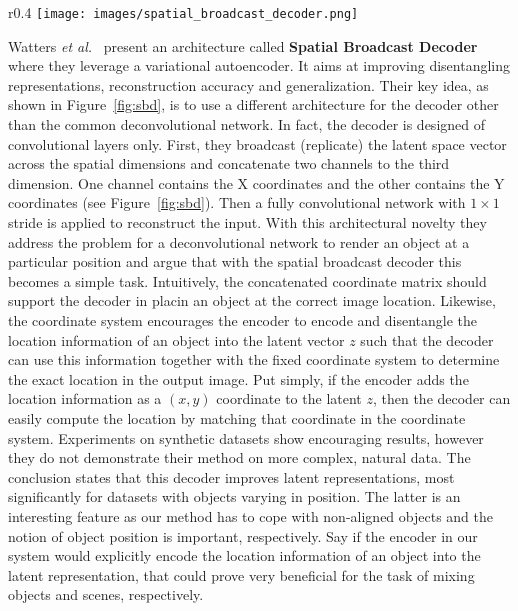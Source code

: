 \documentclass[a4paper,12pt]{report}
\begin{document}
\begin{wrapfigure}{r}{0.4\textwidth}
\texttt{[image: images/spatial\_broadcast\_decoder.png]} 
\caption{Spatial broadcast decoder \cite{SpatialBDecoder}.}
\label{fig:sbd}
\end{wrapfigure}
\par Watters \textit{et al.}~\cite{SpatialBDecoder} present an architecture called \textbf{Spatial Broadcast Decoder} where they leverage a variational autoencoder. It aims at improving disentangling representations, reconstruction accuracy and generalization. Their key idea, as shown in Figure~\ref{fig:sbd}, is to use a different architecture for the decoder other than the common deconvolutional network. In fact, the decoder is designed of convolutional layers only. First, they broadcast (replicate) the latent space vector across the spatial dimensions and concatenate two channels to the third dimension. One channel contains the X coordinates and the other contains the Y coordinates (see Figure~\ref{fig:sbd}). Then a fully convolutional network with $1 \times 1$ stride is applied to reconstruct the input. With this architectural novelty they address the problem for a deconvolutional network to render an object at a particular position and argue that with the spatial broadcast 
decoder this becomes a simple task. Intuitively, the concatenated coordinate matrix should support the decoder in placin an object at the correct image location. Likewise, the coordinate system encourages the encoder to encode and disentangle the location information of an object into the latent vector $z$ such that the decoder can use this information together with the fixed coordinate system to determine the exact location in the output image. Put simply, if the encoder adds the location information as a $(x,y)$ coordinate to the latent $z$, then the decoder can easily compute the location by matching that coordinate in the coordinate system. Experiments on synthetic datasets show encouraging results, however they do not demonstrate their method on more complex, natural data. The conclusion states that this decoder improves latent representations, most significantly for datasets with objects varying in position. The latter is an interesting feature as our method has to cope with non-aligned objects and the notion of object position is important, respectively. Say if the encoder in our system would explicitly encode the location information of an object into the latent representation, that could prove very beneficial for the task of mixing objects and scenes, respectively.
\end{document}
